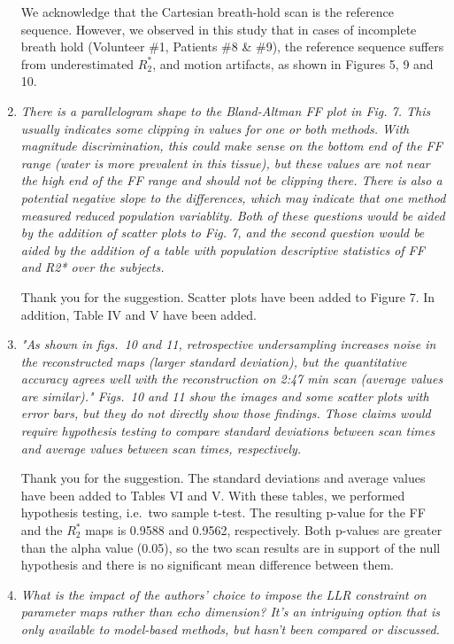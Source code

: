 \documentclass[a4paper,11pt]{report}
\begin{document}
\begin{enumerate}
\hspace{1em} We acknowledge that the Cartesian breath-hold scan is the reference sequence. 
However, we observed in this study that in cases of incomplete breath hold 
(Volunteer \#1, Patients \#8 \& \#9), 
the reference sequence suffers from underestimated $R_2^*$, and motion artifacts, 
as shown in Figures 5, 9 and 10.

	\item \textit{There is a parallelogram shape to the Bland-Altman FF plot in Fig. 7. This usually indicates some clipping in values for one or both methods. With magnitude discrimination, this could make sense on the bottom end of the FF range (water is more prevalent in this tissue), but these values are not near the high end of the FF range and should not be clipping there. There is also a potential negative slope to the differences, which may indicate that one method measured reduced population variablity. Both of these questions would be aided by the addition of scatter plots to Fig. 7, and the second question would be aided by the addition of a table with population descriptive statistics of FF and R2* over the subjects.}

\hspace{1em} Thank you for the suggestion. 
Scatter plots have been added to Figure 7. In addition, Table IV and V have been added.

	\item \textit{"As shown in figs.~10 and 11, retrospective undersampling increases noise in the reconstructed maps (larger standard deviation), but the quantitative accuracy agrees well with the reconstruction on 2:47 min scan (average values are similar)." Figs.~10 and 11 show the images and some scatter plots with error bars, but they do not directly show those findings. Those claims would require hypothesis testing to compare standard deviations between scan times and average values between scan times, respectively.}

\hspace{1em} Thank you for the suggestion. 
The standard deviations and average values have been added to Tables VI and V. 
With these tables, we performed hypothesis testing, i.e.~two sample t-test. 
The resulting p-value for the FF and the $R_2^*$ maps is 0.9588 and 0.9562, respectively.
Both p-values are greater than the alpha value (0.05), 
so the two scan results are in support of the null hypothesis 
and there is no significant mean difference between them.

	\item \textit{What is the impact of the authors' choice to impose the LLR constraint on parameter maps rather than echo dimension? It's an intriguing option that is only available to model-based methods, but hasn't been compared or discussed.}


\end{enumerate}
\end{document}
